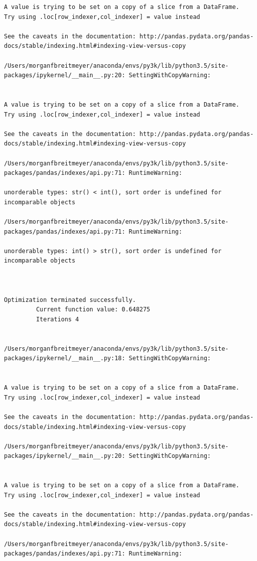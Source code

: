 \begin{lstlisting}
A value is trying to be set on a copy of a slice from a DataFrame.
Try using .loc[row_indexer,col_indexer] = value instead

See the caveats in the documentation: http://pandas.pydata.org/pandas-docs/stable/indexing.html#indexing-view-versus-copy

/Users/morganfbreitmeyer/anaconda/envs/py3k/lib/python3.5/site-packages/ipykernel/__main__.py:20: SettingWithCopyWarning:


A value is trying to be set on a copy of a slice from a DataFrame.
Try using .loc[row_indexer,col_indexer] = value instead

See the caveats in the documentation: http://pandas.pydata.org/pandas-docs/stable/indexing.html#indexing-view-versus-copy

/Users/morganfbreitmeyer/anaconda/envs/py3k/lib/python3.5/site-packages/pandas/indexes/api.py:71: RuntimeWarning:

unorderable types: str() < int(), sort order is undefined for incomparable objects

/Users/morganfbreitmeyer/anaconda/envs/py3k/lib/python3.5/site-packages/pandas/indexes/api.py:71: RuntimeWarning:

unorderable types: int() > str(), sort order is undefined for incomparable objects



Optimization terminated successfully.
         Current function value: 0.648275
         Iterations 4


/Users/morganfbreitmeyer/anaconda/envs/py3k/lib/python3.5/site-packages/ipykernel/__main__.py:18: SettingWithCopyWarning:


A value is trying to be set on a copy of a slice from a DataFrame.
Try using .loc[row_indexer,col_indexer] = value instead

See the caveats in the documentation: http://pandas.pydata.org/pandas-docs/stable/indexing.html#indexing-view-versus-copy

/Users/morganfbreitmeyer/anaconda/envs/py3k/lib/python3.5/site-packages/ipykernel/__main__.py:20: SettingWithCopyWarning:


A value is trying to be set on a copy of a slice from a DataFrame.
Try using .loc[row_indexer,col_indexer] = value instead

See the caveats in the documentation: http://pandas.pydata.org/pandas-docs/stable/indexing.html#indexing-view-versus-copy

/Users/morganfbreitmeyer/anaconda/envs/py3k/lib/python3.5/site-packages/pandas/indexes/api.py:71: RuntimeWarning:


\end{lstlisting}
